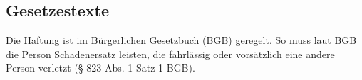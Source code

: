 \documentclass[12pt,a4paper]{article}
\begin{document}
\subsection{Gesetzestexte}

Die Haftung ist im Bürgerlichen Gesetzbuch (BGB) geregelt. So muss laut BGB die Person Schadenersatz leisten, die fahrlässig oder vorsätzlich eine andere Person verletzt (§ 823 Abs. 1 Satz 1 BGB).

\newpage
\begingroup
{} %
\setlength{\bibitemsep}{1\baselineskip} %
\printbibliography[title=Literaturverzeichnis]
\endgroup
\end{document}
